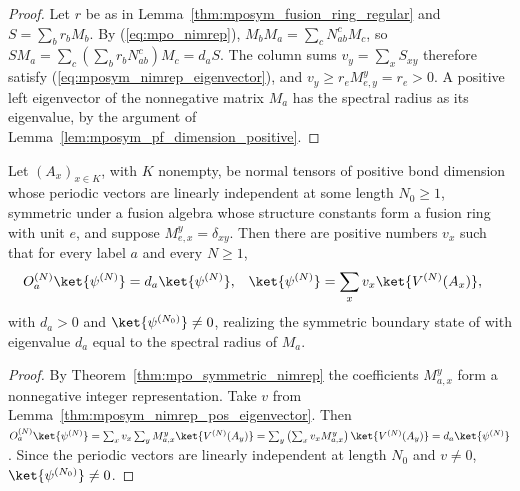 \begin{proof}
    \leanok
    Let $r$ be as in Lemma~\ref{thm:mposym_fusion_ring_regular} and
    $S=\sum_br_bM_b$. By (\ref{eq:mpo_nimrep}),
    $M_bM_a=\sum_cN_{ab}^cM_c$, so
    $SM_a=\sum_c\left(\sum_br_bN_{ab}^c\right)M_c=d_aS$. The column sums
    $v_y=\sum_xS_{xy}$ therefore satisfy (\ref{eq:mposym_nimrep_eigenvector}),
    and $v_y\geq r_eM_{e,y}^y=r_e>0$. A positive left eigenvector of the
    nonnegative matrix $M_a$ has the spectral radius as its eigenvalue, by
    the argument of Lemma~\ref{lem:mposym_pf_dimension_positive}.
\end{proof}

\begin{lemma}%
    \label{thm:mposym_symmetric_boundary_state}
    \leanok
    Let $(A_x)_{x\in K}$, with $K$ nonempty, be normal tensors of positive bond dimension whose
    periodic vectors are linearly independent at some length $N_0\geq1$,
    symmetric under a fusion algebra whose structure constants form a fusion
    ring with unit $e$, and suppose $M_{e,x}^y=\delta_{xy}$. Then there are
    positive numbers $v_x$ such that for every label $a$ and every
    $N\geq1$,
    \begin{align}
        O_a^{(N)}\ket{\psi^{(N)}} & =d_a\ket{\psi^{(N)}},         &
        \ket{\psi^{(N)}}          & =\sum_xv_x\ket{V^{(N)}(A_x)},
        \notag
    \end{align}
    with $d_a>0$ and $\ket{\psi^{(N_0)}}\neq0$, realizing the symmetric
    boundary state of \cite[Section~5]{GarreRubio2023MPOSym} with eigenvalue
    $d_a$ equal to the spectral radius of $M_a$.
\end{lemma}

\begin{proof}
    \leanok
    By Theorem~\ref{thm:mpo_symmetric_nimrep} the coefficients $M_{a,x}^y$
    form a nonnegative integer representation. Take $v$ from
    Lemma~\ref{thm:mposym_nimrep_pos_eigenvector}. Then
    $O_a^{(N)}\ket{\psi^{(N)}}=\sum_xv_x\sum_yM_{a,x}^y\ket{V^{(N)}(A_y)}
        =\sum_y\left(\sum_xv_xM_{a,x}^y\right)\ket{V^{(N)}(A_y)}
        =d_a\ket{\psi^{(N)}}$. Since the periodic vectors are linearly independent at length $N_0$ and $v\neq0$, $\ket{\psi^{(N_0)}}\neq0$.
\end{proof}

